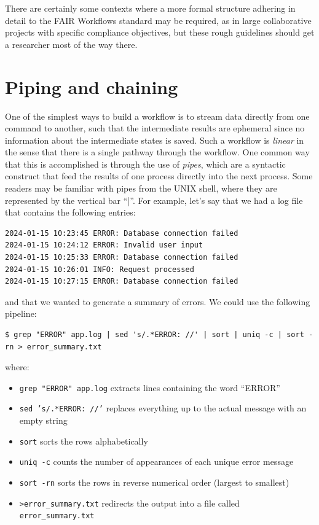 There are certainly some contexts where a more formal structure adhering in detail to the FAIR Workflows standard may be required, as in large collaborative projects with specific compliance objectives, but these rough guidelines should get a researcher most of the way there.

\section{Piping and chaining}

One of the simplest ways to build a workflow is to stream data directly from one command to another, such that the intermediate results are ephemeral since no information about the intermediate states is saved.  Such a workflow is \textit{linear} in the sense that there is a single pathway through the workflow. One common way that this is accomplished is through the use of \textit{pipes}, which are a syntactic construct that feed the results of one process directly into the next process.  Some readers may be familiar with pipes from the UNIX shell, where they are represented by the vertical bar ``|''.  For example, let's say that we had a log file that contains the following entries:

\begin{lstlisting}[style=shell]
2024-01-15 10:23:45 ERROR: Database connection failed
2024-01-15 10:24:12 ERROR: Invalid user input
2024-01-15 10:25:33 ERROR: Database connection failed
2024-01-15 10:26:01 INFO: Request processed
2024-01-15 10:27:15 ERROR: Database connection failed
\end{lstlisting}

and that we wanted to generate a summary of errors. We could use the following pipeline:

\begin{lstlisting}[style=shell, numbers=none]
$ grep "ERROR" app.log | sed 's/.*ERROR: //' | sort | uniq -c | sort -rn > error_summary.txt
\end{lstlisting}

where:

\begin{itemize}
\item \texttt{grep "ERROR" app.log} extracts lines containing the word ``ERROR''
\item \texttt{sed 's/.*ERROR: //'} replaces everything up to the actual message with an empty string
\item \texttt{sort} sorts the rows alphabetically
\item \texttt{uniq -c} counts the number of appearances of each unique error message
\item \texttt{sort -rn}  sorts the rows in reverse numerical order (largest to smallest)
\item \texttt{\textgreater  error\_summary.txt} redirects the output into a file called \texttt{error\_summary.txt}
\end{itemize}

